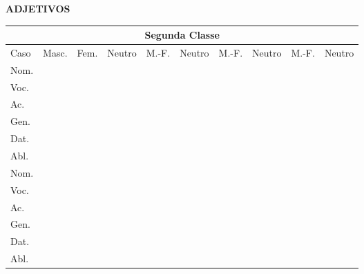 \documentclass[12pt, oneside, a4paper, article]{article}
\begin{document}
\begin{table}[!ht]
\centering
\textbf{ADJETIVOS}
\vspace{1 ex}

\begin{tabular}
{|l||p{1.4cm}|p{1.4cm}|p{1.4cm}||p{1.4cm}|p{1.4cm}||p{1.1cm}|p{1.1cm}||p{1.1cm}|p{1.1cm}||} 
\hline \hline
\multicolumn{10}{|c|}{Segunda Classe} \\
\hline
Caso & Masc. & Fem. & Neutro & M.-F. & Neutro & M.-F. & Neutro & M.-F. & Neutro
\\
\hline
Nom. & & & & & & \multicolumn{2}{p{2cm}||}{} & \multicolumn{2}{p{2cm}||}{} \\ \hline
Voc. & & & & & & \multicolumn{2}{p{2cm}||}{} & \multicolumn{2}{p{2cm}||}{} \\ \hline
Ac.  & & & & & & & & & \\ \hline
Gen. & & & & & & \multicolumn{2}{p{2cm}||}{} & \multicolumn{2}{p{2cm}||}{} \\ \hline
Dat. & & & & & & \multicolumn{2}{p{2cm}||}{} & \multicolumn{2}{p{2cm}||}{} \\ \hline
Abl. & & & & & & \multicolumn{2}{p{2cm}||}{} & \multicolumn{2}{p{2cm}||}{} \\ 
\hline \hline                             
Nom. & & & & & & & & & \\ \hline
Voc. & & & & & & & & & \\ \hline
Ac.  & & & & & & & & & \\ \hline
Gen. & & & & & & \multicolumn{2}{p{2cm}||}{} & \multicolumn{2}{p{2cm}||}{} \\ \hline
Dat. & & & & & & \multicolumn{2}{p{2cm}||}{} & \multicolumn{2}{p{2cm}||}{} \\ \hline
Abl. & & & & & & \multicolumn{2}{p{2cm}||}{} & \multicolumn{2}{p{2cm}||}{} \\ 
\hline \hline
\end{tabular}
\end{table}

\clearpage
\end{document}
